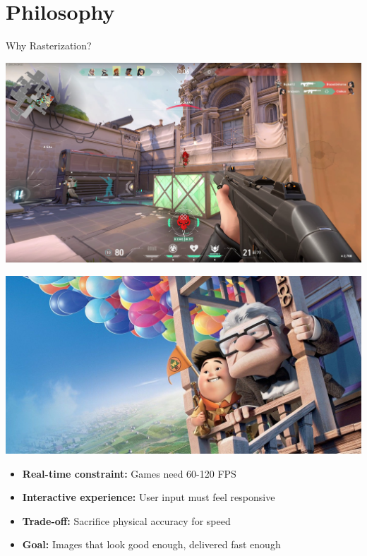 \section{Philosophy}

\begin{frame}{Why Rasterization?}
  \pause
  \begin{minipage}{0.45\textwidth}
    \centering
    \includegraphics[width=\linewidth]{images/valorant_gameplay.png}
  \end{minipage}%
  \hfill
  \pause
  \begin{minipage}{0.45\textwidth}
    \centering
    \includegraphics[width=\linewidth]{images/pixar_movie.jpg}
  \end{minipage}

  \begin{itemize}
    \item<3-> \textbf{Real-time constraint:} Games need 60-120 FPS
    \item<4-> \textbf{Interactive experience:} User input must feel responsive
    \item<5-> \textbf{Trade-off:} Sacrifice physical accuracy for speed
    \item<6-> \textbf{Goal:} Images that look good enough, delivered fast enough
  \end{itemize}
\end{frame}

